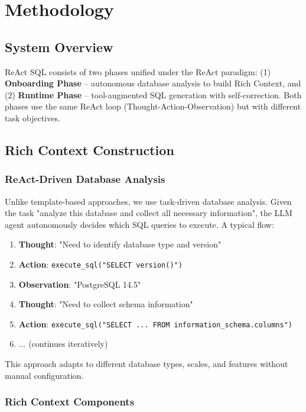 \section{Methodology}

\subsection{System Overview}

ReAct SQL consists of two phases unified under the ReAct paradigm: (1) \textbf{Onboarding Phase} -- autonomous database analysis to build Rich Context, and (2) \textbf{Runtime Phase} -- tool-augmented SQL generation with self-correction. Both phases use the same ReAct loop (Thought-Action-Observation) but with different task objectives.

\subsection{Rich Context Construction}

\subsubsection{ReAct-Driven Database Analysis}

Unlike template-based approaches, we use task-driven database analysis. Given the task "analyze this database and collect all necessary information", the LLM agent autonomously decides which SQL queries to execute. A typical flow:

\begin{enumerate}
    \item \textbf{Thought}: "Need to identify database type and version"
    \item \textbf{Action}: \texttt{execute\_sql("SELECT version()")}
    \item \textbf{Observation}: "PostgreSQL 14.5"
    \item \textbf{Thought}: "Need to collect schema information"
    \item \textbf{Action}: \texttt{execute\_sql("SELECT ... FROM information\_schema.columns")}
    \item ... (continues iteratively)
\end{enumerate}

This approach adapts to different database types, scales, and features without manual configuration.

\subsubsection{Rich Context Components}

